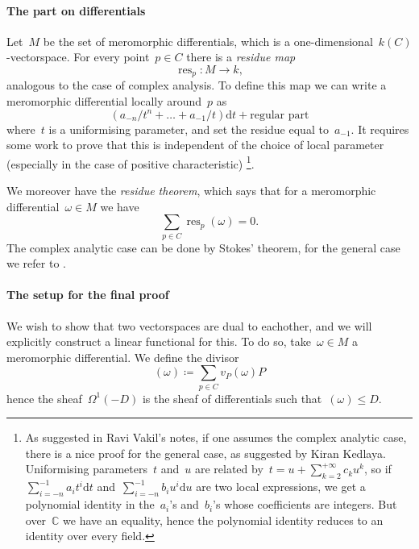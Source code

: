 \documentclass[10pt,a4paper]{article}
\theoremstyle{lecture}
\newcommand\dash{\nobreakdash-\hspace{0pt}}
\newcommand\dd{\mathrm{d}}
\DeclareMathOperator\res{res}
\begin{document}
\paragraph{The part on differentials}

Let~$M$ be the set of meromorphic differentials, which is a one-dimensional~$k(C)$\dash vectorspace. For every point~$p\in C$ there is a \emph{residue map}
\begin{equation}
  \res_p\colon M\to k,
\end{equation}
analogous to the case of complex analysis. To define this map we can write a meromorphic differential locally around~$p$ as
\begin{equation}
  (a_{-n}/t^n+\dotso+a_{-1}/t)\dd t+\text{regular part}
\end{equation}
where~$t$ is a uniformising parameter, and set the residue equal to~$a_{-1}$. It requires some work to prove that this is independent of the choice of local parameter (especially in the case of positive characteristic) \addreference\footnote{As suggested in Ravi Vakil's notes, if one assumes the complex analytic case, there is a nice proof for the general case, as suggested by Kiran Kedlaya. Uniformising parameters~$t$ and~$u$ are related by~$t=u+\sum_{k=2}^{+\infty}c_ku^k$, so if~$\sum_{i=-n}^{-1}a_it^i\dd t$ and~$\sum_{i=-n}^{-1}b_iu^i\dd u$ are two local expressions, we get a polynomial identity in the~$a_i$'s and~$b_i$'s whose coefficients are integers. But over~$\mathbb{C}$ we have an equality, hence the polynomial identity reduces to an identity over every field.}.

We moreover have the \emph{residue theorem}, which says that for a meromorphic differential~$\omega\in M$ we have
\begin{equation}
  \sum_{p\in C}\res_p(\omega)=0.
\end{equation}
The complex analytic case can be done by Stokes' theorem, for the general case we refer to \addreference.

\paragraph{The setup for the final proof}
We wish to show that two vectorspaces are dual to eachother, and we will explicitly construct a linear functional for this. To do so, take~$\omega\in M$ a meromorphic differential. We define the divisor
\begin{equation}
  (\omega)\coloneqq\sum_{p\in C}v_P(\omega)P
\end{equation}
hence the sheaf~$\Omega^1(-D)$ is the sheaf of differentials such that~$(\omega)\leq D$.
\end{document}
